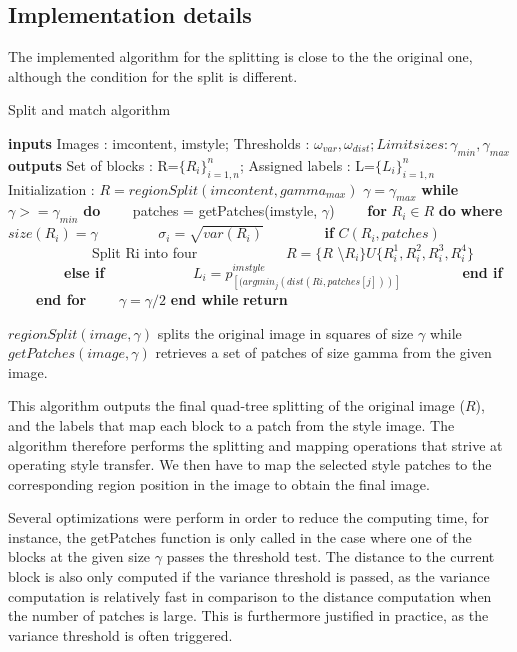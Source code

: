 \documentclass[a4paper]{article}
\begin{document}
\subsection{Implementation details}

The implemented algorithm for the splitting is close to the the original one, although the condition for the split is different.

\begin{algorithm}
\caption{Split and match algorithm}\label{quadtree-algo}
\begin{algorithmic}[1]
\Statex \textbf{inputs} Images : imcontent, imstyle; Thresholds : $\omega_{var}, \omega_{dist}; Limit sizes : \gamma_{min}, \gamma_{max}$
\Statex \textbf{outputs} Set of blocks : R=$\{R_i\}_{i=1,n}^n$; Assigned labels : L=$\{L_i\}_{i=1,n}^n$
\Statex Initialization : $R=regionSplit(imcontent, gamma_{max})$
\Statex $\gamma = \gamma_{max}$ 
\Statex \textbf{while} $\gamma>= \gamma_{min}$ \textbf{do}
\Statex ~~~~patches = getPatches(imstyle, $\gamma$)
\Statex ~~~~\textbf{for} $R_i \in R$ \textbf{do} \textbf{where} $size(R_i)=\gamma$
\Statex ~~~~~~~~$\sigma_i = \sqrt{var(R_i)}$
\Statex ~~~~~~~~\textbf{if} $C(R_i, patches)$ 
\Statex ~~~~~~~~~~~~Split Ri into four
\Statex ~~~~~~~~~~~~$R = \{R$ \textbackslash $R_i\} U \{R_i^1, R_i^2, R_i^3, R_i^4\}$ 
\Statex ~~~~~~~~\textbf{else if}
\Statex ~~~~~~~~~~~~$L_i = p^{imstyle}_{[(argmin_{j}(dist(Ri,patches[j]))]}$
\Statex ~~~~~~~~\textbf{end if}
\Statex ~~~~\textbf{end for}
\Statex ~~~~$\gamma = \gamma /2$
\Statex \textbf{end while}
\Statex \textbf{return}
\end{algorithmic}
\end{algorithm}

$regionSplit(image, \gamma)$ splits the original image in squares of size $\gamma$ while $getPatches(image, \gamma)$ retrieves a set of patches of size gamma from the given image.

This algorithm outputs the final quad-tree splitting of the original image ($R$), and the labels that map each block to a patch from the style image. The algorithm therefore performs the splitting and mapping operations that strive at operating style transfer. We then have to map the selected style patches to the corresponding region position in the image to obtain the final image. 

Several optimizations were perform in order to reduce the computing time, for instance, the getPatches function is only called in the case where one of the blocks at the given size $\gamma$ passes the threshold test. The distance to the current block is also only computed if the variance threshold is passed, as the variance computation is relatively fast in comparison to the distance computation when the number of patches is large. This is furthermore justified in practice, as the variance threshold is often triggered.
\end{document}
